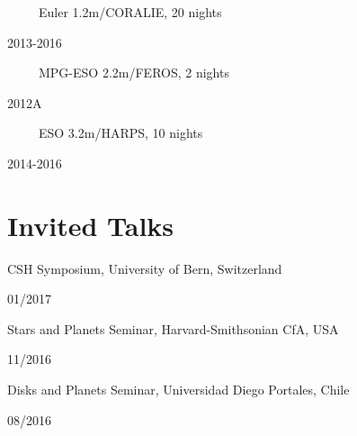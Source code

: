 \documentclass[11pt, a4paper]{article} %
\begin{document}
\begin{minipage}[t]{0.7\textwidth}
\ \ \ \ \ Euler 1.2m/CORALIE, 20 nights
\end{minipage}
\begin{minipage}[t]{0.3\textwidth}
\hfill 2013-2016
\end{minipage}

\begin{minipage}[t]{0.7\textwidth}
\ \ \ \ \ MPG-ESO 2.2m/FEROS, 2 nights
\end{minipage}
\begin{minipage}[t]{0.3\textwidth}
\hfill 2012A
\end{minipage}

\begin{minipage}[t]{0.7\textwidth}
\ \ \ \ \ ESO 3.2m/HARPS, 10 nights
\end{minipage}
\begin{minipage}[t]{0.3\textwidth}
\hfill 2014-2016
\end{minipage}
\section*{Invited Talks}

\begin{minipage}[t]{0.7\textwidth}
\begin{flushleft}%
  \setlength{\leftskip}{0.2cm}%
CSH Symposium, University of Bern, Switzerland
\end{flushleft}
\end{minipage}
\begin{minipage}[t]{0.3\textwidth}
\hfill 01/2017
\end{minipage}

\begin{minipage}[t]{0.7\textwidth}
\begin{flushleft}%
  \setlength{\leftskip}{0.2cm}%
Stars and Planets Seminar, Harvard-Smithsonian CfA, USA
\end{flushleft}
\end{minipage}
\begin{minipage}[t]{0.3\textwidth}
\hfill 11/2016
\end{minipage}

\begin{minipage}[t]{0.7\textwidth}
\begin{flushleft}%
  \setlength{\leftskip}{0.2cm}%
Disks and Planets Seminar, Universidad Diego Portales, Chile
\end{flushleft}
\end{minipage}
\begin{minipage}[t]{0.3\textwidth}
\hfill 08/2016
\end{minipage}
\end{document}
